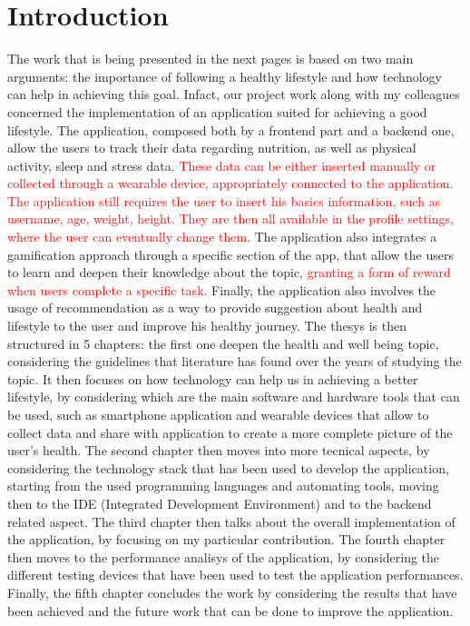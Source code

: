\section*{Introduction}
The work that is being presented in the next pages is based on two main arguments: the importance of following a healthy lifestyle and how technology can help in achieving this goal. Infact, our project work along with my colleagues concerned the implementation of an application suited for achieving a good lifestyle. The application, composed both by a frontend part and a backend one, allow the users to track their data regarding nutrition, as well as physical activity, sleep and stress data. \textcolor{red}{These data can be either inserted manually or collected through a wearable device, appropriately connected to the application. The application still requires the user to insert his basics information, such as username, age, weight, height. They are then all available in the profile settings, where the user can eventually change them}. The application also integrates a gamification approach through a specific section of the app, that allow the users to learn and deepen their knowledge about the topic, \textcolor{red}{granting a form of reward when users complete a specific task.} Finally, the application also involves the usage of recommendation as a way to provide suggestion about health and lifestyle to the user and improve his healthy journey. The thesys is then structured in 5 chapters: the first one deepen the health and well being topic, considering the guidelines that literature has found over the years of studying the topic. It then focuses on how technology can help us in achieving a better lifestyle, by considering which are the main software and hardware tools that can be used, such as smartphone application and wearable devices that allow to collect data and share with application to create a more complete picture of the user's health. The second chapter then moves into more tecnical aspects, by considering the technology stack that has been used to develop the application, starting from the used programming languages and automating tools, moving then to the IDE (Integrated Development Environment) and to the backend related aspect. The third chapter then talks about the overall implementation of the application, by focusing on my particular contribution. The fourth chapter then moves to the performance analisys of the application, by considering the different testing devices that have been used to test the application performances. Finally, the fifth chapter concludes the work by considering the results that have been achieved and the future work that can be done to improve the application.
